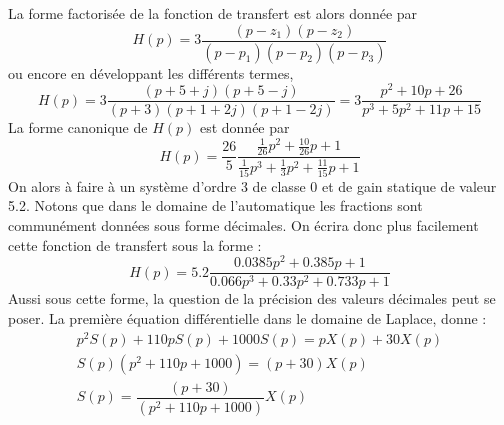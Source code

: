 La forme factorisée de la fonction de transfert est alors donnée par 
\[
    H(p)=3\dfrac{(p-z_1)(p-z_2)}{(p-p_1)(p-p_2)(p-p_3)}
\]
ou encore en développant les différents termes,
\[
    H(p)=3\dfrac{(p+5+j)(p+5-j)}{(p+3)(p+1+2j)(p+1-2j)}
        =3\dfrac{p^2+10p+26}{p^3+5p^2+11p+15}
\]
La forme canonique de $H(p)$ est donnée par 
\[
    H(p)=\dfrac{26}{5}\dfrac{\frac{1}{26}p^2+\frac{10}{26}p+1}
                            {\frac{1}{15}p^3+\frac{1}{3}p^2+\frac{11}{15}p+1}
\]
On alors à faire à un système d'ordre 3 de classe 0 et de gain statique 
de valeur 5.2. 
Notons que dans le domaine de l'automatique les fractions sont communément
données sous forme décimales. On écrira donc plus facilement cette fonction
de transfert sous la forme :
\[
    H(p)=5.2\dfrac{0.0385p^2+0.385p+1}{0.066p^3+0.33p^2+0.733p+1}
\]
Aussi sous cette forme, la question de la précision des valeurs décimales 
peut se poser. 
La première équation différentielle dans le domaine de Laplace, donne :
\begin{align*}
    p^2S(p)+110pS(p)+1000S(p)=pX(p)+30X(p) \\
    S(p) ( p^2+110p+1000) = (p+30)X(p) \\
    S(p) = \dfrac{(p+30)}{(p^2+110p+1000)} X(p)
\end{align*}
